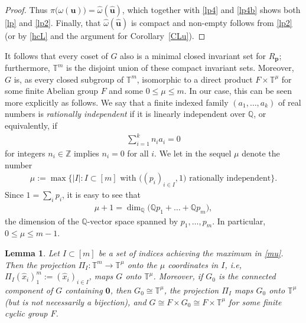 \documentclass[11pt,reqno,tbtags,a4paper]{amsart}
\numberwithin{equation}{section}
\renewcommand\le{\leq}
\renewcommand\leq{\leqslant}
\theoremstyle{plain}%
\newtheorem{lemma}[theorem]{Lemma}
\theoremstyle{definition}
\theoremstyle{remark}
\newcommand{\refC}[1]{Corollary~\ref{#1}}
\newcommand\bigset[1]{\ensuremath{\bigl\{#1\bigr\}}}
\newcommand\bigpar[1]{\bigl(#1\bigr)}
\newcommand\punkt{\xperiod}    %
\newcommand\ie{i.e\punkt}
\newcommand\bbT{\mathbb T}
\newcommand\bbQ{\mathbb Q}
\newcommand\bbZ{\mathbb Z}
\newcommand\cL{{\omega}}
\newcommand\hcL{\hat{\cL}}
\newcommand\vp{\mathbf{p}}
\newcommand\vu{\mathbf{u}}
\newcommand\hvu{{\hat{\mathbf{u}}}}
\newcommand\hx{\hat x}
\newcommand\Rp{R_\vp}
\newcommand\0{{\boldsymbol 0}}
\newcommand\1{{\boldsymbol 1}}
\begin{document}
\begin{proof}
Thus $\pi\bigpar{\cL(\vu)}=\hcL(\hvu)$, 
which together with \eqref{lp4} and \eqref{lp4b} shows both \eqref{lp}
and \eqref{lp2}.
Finally,
that $\hcL(\hvu)$ is compact and non-empty 
follows from \eqref{lp2}
(or by \eqref{hcL} and the argument for  \refC{CLu}).
\end{proof}

It follows that 
every coset of $G$ also
is a minimal closed invariant set for $\Rp$;
furthermore, $\bbT^m$ is the disjoint union of
these compact invariant sets.
Moreover, $G$ is, as every closed subgroup of $\bbT^m$, 
isomorphic to a direct product $F\times\bbT^\mu$ for some finite Abelian
group $F$ and some $0\le\mu\le m$.
In our case, this can be seen more explicitly as follows.
We say that a finite indexed family $(a_1,\dots,a_k)$ of real numbers is
\emph{rationally independent} if it is linearly independent over $\bbQ$,
or equivalently, if
\begin{align}\label{pi3}
  \sum_{i=1}^kn_ia_i=0
\end{align}
for integers $n_i\in\bbZ$ implies $n_i=0$ for all $i$.
We let in the sequel $\mu$ denote the number
\begin{align}\label{mu}
  \mu:=
\max\bigset{|I|:I\subset[m] \text{ with }
\bigl((p_i)_{i\in I},1\bigr) \text{ rationally independent}}.
\end{align}
%
%
%
%
Since $1=\sum_i p_i$, it is easy to see that 
\begin{align}\label{mu2}
\mu+1 = \dim_\bbQ \bigpar{\bbQ p_1+\dots+\bbQ p_m}
,\end{align}
the dimension of the $\bbQ$-vector space spanned by $p_1,\dots,p_m$.   
In particular, $0\le \mu\le m-1$.
 
\begin{lemma}\label{LG}
%
%
%
Let $I\subset[m]$ be a set of indices achieving the maximum in \eqref{mu}.
Then the projection $\Pi_I:\bbT^m\to\bbT^\mu$ 
onto the $\mu$ coordinates in $I$,
\ie, $\Pi_I(\hx_i)_1^m:=(\hx_i)_{i\in I}$,
maps $G$ onto $\bbT^\mu$. Moreover, if $G_0$ is the connected component of $G$
containing $\0$, then $G_0\cong\bbT^\mu$, the projection $\Pi_I$ maps $G_0$
onto $\bbT^\mu$ (but is not necessarily a bijection), and $G\cong F\times
G_0\cong F\times\bbT^\mu$ for some finite cyclic group $F$.
\end{lemma}
\end{document}
